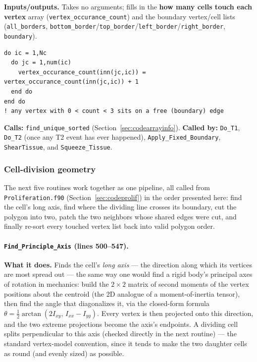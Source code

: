 \documentclass[11pt]{article}
\begin{document}
\textbf{Inputs/outputs.} Takes no arguments; fills in the \textbf{how many cells touch
each vertex} array (\texttt{vertex\_occurance\_count}) and the boundary vertex/cell
lists (\texttt{all\_borders}, \texttt{bottom\_border}/\texttt{top\_border}/\texttt{left\_border}/\texttt{right\_border},
\texttt{boundary}).

\begin{lstlisting}[caption={The vertex-degree test at the heart of \texttt{Find\_boundary\_dynamic}: an interior vertex is touched by exactly 3 cells.}]
do ic = 1,Nc
  do jc = 1,num(ic)
    vertex_occurance_count(inn(jc,ic)) = vertex_occurance_count(inn(jc,ic)) + 1
  end do
end do
! any vertex with 0 < count < 3 sits on a free (boundary) edge
\end{lstlisting}

\textbf{Calls:} \texttt{find\_unique\_sorted} (Section~\ref{sec:codearrayinfo}).
\textbf{Called by:} \texttt{Do\_T1}, \texttt{Do\_T2} (once any T2 event has ever
happened), \texttt{Apply\_Fixed\_Boundary}, \texttt{ShearTissue}, and
\texttt{Squeeze\_Tissue}.

\subsubsection*{Cell-division geometry}

The next five routines work together as one pipeline, all called from
\texttt{Proliferation.f90} (Section~\ref{sec:codeprolif}) in the order presented here:
find the cell's long axis, find where the dividing line crosses its boundary, cut the
polygon into two, patch the two neighbors whose shared edges were cut, and finally
re-sort every touched vertex list back into valid polygon order.

\paragraph{\texttt{Find\_Principle\_Axis} (lines 500--547).}
\textbf{What it does.} Finds the cell's \emph{long axis} --- the direction along which
its vertices are most spread out --- the same way one would find a rigid body's
principal axes of rotation in mechanics: build the $2\times2$ matrix of second moments
of the vertex positions about the centroid (the 2D analogue of a moment-of-inertia
tensor), then find the angle that diagonalizes it, via the closed-form formula
$\theta = \tfrac12\arctan(2I_{xy},\,I_{xx}-I_{yy})$. Every vertex is then projected onto
this direction, and the two extreme projections become the axis's endpoints. A dividing
cell splits perpendicular to this axis (checked directly in the next routine) --- the
standard vertex-model convention, since it tends to make the two daughter cells as
round (and evenly sized) as possible.
\end{document}
